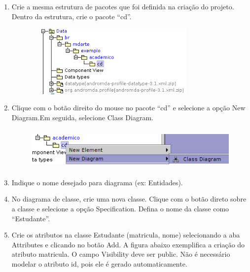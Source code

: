 \begin{enumerate}
\item Crie a mesma estrutura de pacotes que foi definida na criação do projeto.
Dentro da estrutura, crie o pacote “cd”.
\begin{figure}[!htb]
	\centering
	\includegraphics[width=250pt,height=100pt]{imgs/tutorial-mdarte-0000.png}
\end{figure}
\item Clique com o botão direito do mouse no pacote “cd” e selecione a opção New
Diagram.Em seguida, selecione Class Diagram.
\begin{figure}[!htb]
	\centering
	\includegraphics[width=400pt,height=60pt]{imgs/tutorial-mdarte-0001.png}
\end{figure}
	
\item Indique o nome desejado para diagrama (ex: Entidades).
	
\item No diagrama de classe, crie uma nova classe. Clique com o botão direto sobre a classe e selecione a opção Specification. Defina o nome da classe como “Estudante”.
	
\item Crie os atributos na classe Estudante (matricula, nome) selecionando a aba Attributes e clicando no botão Add. A figura abaixo exemplifica a criação do atributo matricula. O campo Visibility deve ser public. Não é necessário modelar o atributo id, pois ele é gerado automaticamente.


\end{enumerate}
